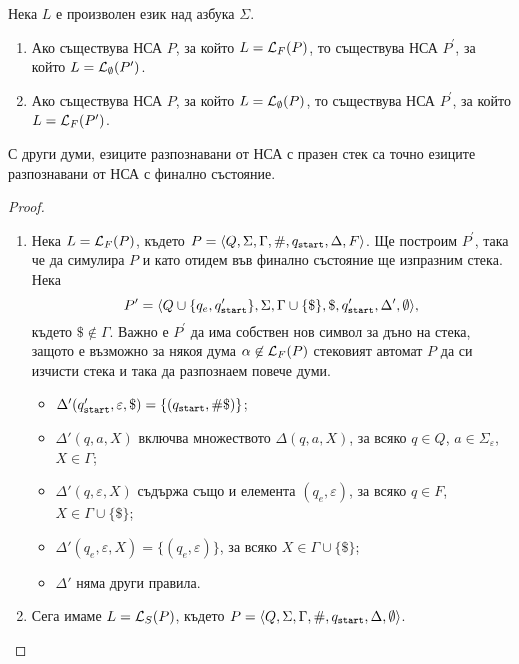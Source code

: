 \begin{thm}
  Нека $L$ е произволен език над азбука $\Sigma$.
  \begin{enumerate}[1)]
  \item 
    Ако съществува НСА $P$, за който $L = \mathcal{L}_F(P)$, то съществува НСА $P^\prime$, за който $L = \mathcal{L}_\emptyset(P^\prime)$.
  \item
    Ако съществува НСА $P$, за който $L = \mathcal{L}_\emptyset(P)$, то съществува НСА $P^\prime$, за който $L = \mathcal{L}_F(P^\prime)$.
  \end{enumerate}
  С други думи, езиците разпознавани от НСА с празен стек са точно езиците разпознавани от НСА с финално състояние.
\end{thm}
\begin{proof}
  \begin{enumerate}[1)]
  \item 
    Нека $L = \mathcal{L}_F(P)$, където $P = \langle{Q,\Sigma,\Gamma,\#,q_{\texttt{start}},\Delta,F}\rangle$.
    Ще построим $P^\prime$, така че да симулира $P$ и като отидем във финално състояние ще изпразним стека.
    Нека
    \[P^\prime = \langle{Q\cup\{q_e,q_{\texttt{start}}'\},\Sigma,\Gamma \cup \{\$\},\$,q_{\texttt{start}}',\Delta^\prime,\emptyset}\rangle,\]
    където $\$ \not\in \Gamma$.
    Важно е $P^\prime$ да има собствен нов символ за дъно на стека, защото е възможно за някоя дума $\alpha \not\in \mathcal{L}_F(P)$
    стековият автомат $P$ да си изчисти стека и така да разпознаем повече думи.
    \begin{itemize}
    \item 
      $\Delta'(q_{\texttt{start}}',\varepsilon,\$) = \{(q_{\texttt{start}},\#\$)\}$;
    \item
      $\Delta'(q,a,X)$ включва множеството $\Delta(q,a,X)$, за всяко $q\in Q$, $a\in\Sigma_\varepsilon$, $X\in\Gamma$;
    \item
      $\Delta'(q,\varepsilon,X)$ съдържа също и елемента $(q_e,\varepsilon)$, за всяко $q\in F$, $X \in \Gamma \cup \{\$\}$;
    \item
      $\Delta'(q_e,\varepsilon,X) = \{(q_e,\varepsilon)\}$, за всяко $X \in \Gamma \cup \{\$\}$;
    \item
      $\Delta'$ няма други правила.
    \end{itemize}
  \item
    Сега имаме $L = \mathcal{L}_S(P)$, където $P = \langle{Q,\Sigma,\Gamma,\#,q_{\texttt{start}},\Delta,\emptyset}\rangle$. 

\end{enumerate}
\end{proof}
